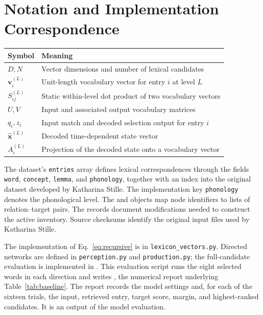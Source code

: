 \section{Notation and Implementation Correspondence}
\label{app:implementation}
\begin{table}[H]
\centering\small
\begin{tabular}{lp{10.3cm}}\toprule
Symbol & Meaning\\\midrule
$D,N$ & Vector dimensions and number of lexical candidates\\
$\mathbf v_i^{(L)}$ & Unit-length vocabulary vector for entry $i$ at level $L$\\
$S^{(L)}_{ij}$ & Static within-level dot product of two vocabulary vectors\\
$U,V$ & Input and associated output vocabulary matrices\\
$q_i,z_i$ & Input match and decoded selection output for entry $i$\\
$\hat{\mathbf x}^{(L)}$ & Decoded time-dependent state vector\\
$A_i^{(L)}$ & Projection of the decoded state onto a vocabulary vector\\\bottomrule
\end{tabular}
\end{table}
The dataset's \texttt{entries} array defines lexical correspondences through the fields \texttt{word}, \texttt{concept}, \texttt{lemma}, and \texttt{phonology}, together with an index into the original dataset developed by Katharina Stille. The implementation key \texttt{phonology} denotes the phonological level. The  and  objects map node identifiers to lists of relation--target pairs. The  records document modifications needed to construct the active inventory. Source checksums identify the original input files used by Katharina Stille.

The implementation of Eq.~\eqref{eq:recursive} is in \texttt{lexicon\_vectors.py}. Directed networks are defined in \texttt{perception.py} and \texttt{production.py}; the full-candidate evaluation is implemented in . This evaluation script runs the eight selected words in each direction and writes , the numerical report underlying Table~\ref{tab:baseline}. The report records the model settings and, for each of the sixteen trials, the input, retrieved entry, target score, margin, and highest-ranked candidates. It is an output of the model evaluation.

